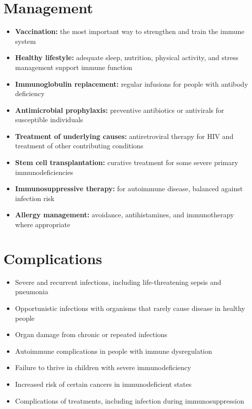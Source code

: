 \section*{Management}
\begin{itemize}
    \item \textbf{Vaccination:} the most important way to strengthen and train the immune system
    \item \textbf{Healthy lifestyle:} adequate sleep, nutrition, physical activity, and stress management support immune function
    \item \textbf{Immunoglobulin replacement:} regular infusions for people with antibody deficiency
    \item \textbf{Antimicrobial prophylaxis:} preventive antibiotics or antivirals for susceptible individuals
    \item \textbf{Treatment of underlying causes:} antiretroviral therapy for HIV and treatment of other contributing conditions
    \item \textbf{Stem cell transplantation:} curative treatment for some severe primary immunodeficiencies
    \item \textbf{Immunosuppressive therapy:} for autoimmune disease, balanced against infection risk
    \item \textbf{Allergy management:} avoidance, antihistamines, and immunotherapy where appropriate
\end{itemize}

\section*{Complications}
\begin{itemize}
    \item Severe and recurrent infections, including life-threatening sepsis and pneumonia
    \item Opportunistic infections with organisms that rarely cause disease in healthy people
    \item Organ damage from chronic or repeated infections
    \item Autoimmune complications in people with immune dysregulation
    \item Failure to thrive in children with severe immunodeficiency
    \item Increased risk of certain cancers in immunodeficient states
    \item Complications of treatments, including infection during immunosuppression
\end{itemize}

